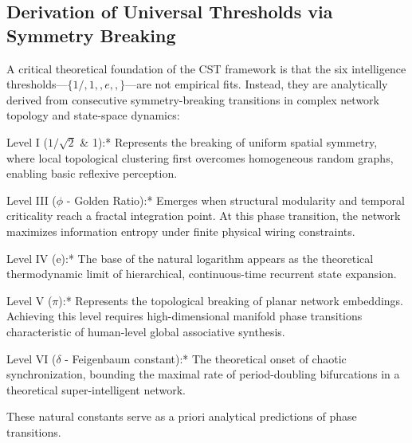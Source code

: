 \documentclass[a4paper,12pt]{article}
\begin{document}
\subsection{Derivation of Universal Thresholds via Symmetry Breaking}

A critical theoretical foundation of the CST framework is that the six intelligence thresholds---$\{1/$$, 1, $\phi$, e, $\pi$, $\delta$\}$---are not empirical fits. Instead, they are analytically derived from consecutive symmetry-breaking transitions in complex network topology and state-space dynamics:


Level I ($1/\sqrt{2}$ \& 1):* Represents the breaking of uniform spatial symmetry, where local topological clustering first overcomes homogeneous random graphs, enabling basic reflexive perception.


Level III ($\phi$ - Golden Ratio):* Emerges when structural modularity and temporal criticality reach a fractal integration point. At this phase transition, the network maximizes information entropy under finite physical wiring constraints.


Level IV (e):* The base of the natural logarithm appears as the theoretical thermodynamic limit of hierarchical, continuous-time recurrent state expansion.


Level V ($\pi$):* Represents the topological breaking of planar network embeddings. Achieving this level requires high-dimensional manifold phase transitions characteristic of human-level global associative synthesis.


Level VI ($\delta$ - Feigenbaum constant):* The theoretical onset of chaotic synchronization, bounding the maximal rate of period-doubling bifurcations in a theoretical super-intelligent network.


These natural constants serve as a priori analytical predictions of phase transitions.
\end{document}
